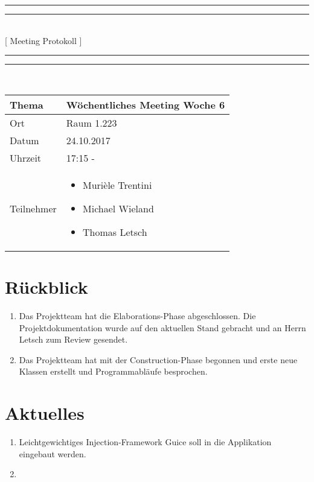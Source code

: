 \documentclass[11pt, a4paper,oneside]{scrartcl}
\begin{document}
\centering
\rule{\textwidth}{1.6pt}\vspace*{-\baselineskip}\vspace*{2pt} %
\rule{\textwidth}{0.4pt}\\[\baselineskip] %
{\LARGE [ Meeting Protokoll ]}\\[0.2\baselineskip] %
\rule{\textwidth}{0.4pt}\vspace*{-\baselineskip}\vspace{3.2pt} %
\rule{\textwidth}{1.6pt}\\[2\baselineskip] %

\begin{tabu} to \linewidth {l X }
	\toprule
	\textbf{Thema} & \textbf{Wöchentliches Meeting Woche 6} \\
	\midrule
	Ort & Raum 1.223 \\
	Datum & 24.10.2017  \\
	Uhrzeit &  17:15 -  \\
	Teilnehmer & 
	\begin{minipage}[t]{\textwidth}
	  	\begin{itemize}
			\item Murièle Trentini
			\item Michael Wieland
			\item Thomas Letsch
	  	\end{itemize}
	\end{minipage}
	\\
	\bottomrule
\end{tabu}


\section{Rückblick}
\begin{enumerate}
	\item Das Projektteam hat die Elaborations-Phase abgeschlossen. Die Projektdokumentation wurde auf den aktuellen Stand gebracht und an Herrn Letsch zum Review gesendet.
	\item Das Projektteam hat mit der Construction-Phase begonnen und erste neue Klassen erstellt und Programmabläufe besprochen.
\end{enumerate}

\section{Aktuelles}
\begin{enumerate}
	\item Leichtgewichtiges Injection-Framework Guice soll in die Applikation eingebaut werden.
	\item 
\end{enumerate}
\end{document}
